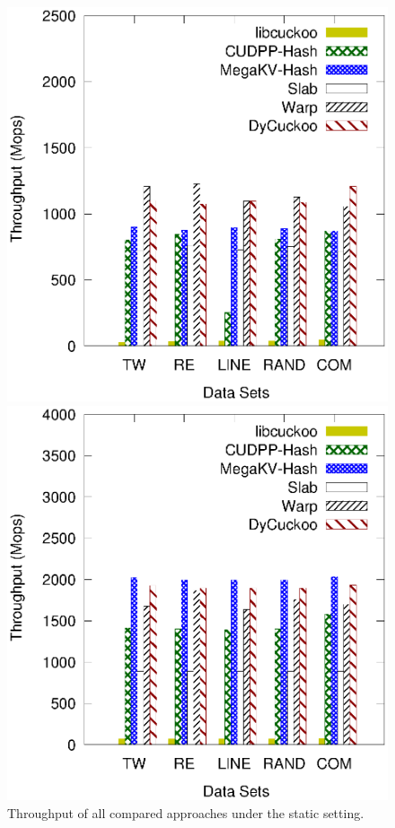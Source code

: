 \begin{figure}[t]
	\begin{minipage}{0.48\linewidth}\centering
		\includegraphics[width=\linewidth]{pic/static/static_insert.eps}
		\centerline{}
	\end{minipage}
	\begin{minipage}{0.48\linewidth}\centering
		\includegraphics[width=\linewidth]{pic/static/static_search.eps}
		\centerline{}
	\end{minipage}
	\caption{Throughput of all compared approaches under the static setting.}
	\label{fig:static-all}
\end{figure}
